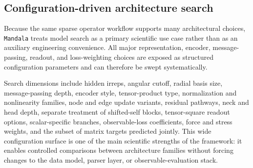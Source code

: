 \subsection{Configuration-driven architecture search}
\label{subsec:search}

Because the same sparse operator workflow supports many architectural choices,
\texttt{Mandala} treats model search as a primary scientific use case rather than as an
auxiliary engineering convenience. All major representation, encoder,
message-passing, readout, and loss-weighting choices are exposed as structured
configuration parameters and can therefore be swept systematically.

Search dimensions include hidden irreps, angular cutoff, radial basis size,
message-passing depth, encoder style, tensor-product type, normalization and
nonlinearity families, node and edge update variants, residual pathways, neck
and head depth, separate treatment of shifted-self blocks, tensor-square readout
options, scalar-specific branches, observable-loss coefficients, force and
stress weights, and the subset of matrix targets predicted jointly. This wide
configuration surface is one of the main scientific strengths of the framework:
it enables controlled comparisons between architecture families without forcing
changes to the data model, parser layer, or observable-evaluation stack.
